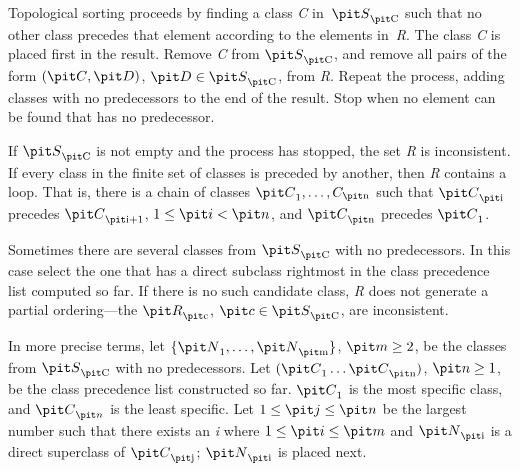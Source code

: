 Topological sorting proceeds by finding a class {\it C} in~${\it S}\sub {\hbox{\scriptsize\it C}}$ such
that no other class precedes that element according to the elements
in~{\it R}.  The class {\it C} is placed first in the result.
Remove {\it C} from ${\it S}\sub {\hbox{\scriptsize\it C}}$, and remove all pairs of the form
$({\it C},{\it D})$,
${\it D}\in {\it S}\sub {\hbox{\scriptsize\it C}}$, from {\it R}. Repeat the process, adding
classes with no predecessors to the end of the result.  Stop when no
element can be found that has no predecessor.

If ${\it S}\sub {\hbox{\scriptsize\it C}}$ is not empty and the process has stopped, the set {\it R} is
inconsistent. If every class in the finite set of classes is preceded
by another, then {\it R} contains a loop. That is, there is a chain of
classes ${\it C}\sub 1,\ldots,C\sub {\hbox{\scriptsize\it n}}$
such that ${\it C}\sub {\hbox{\scriptsize\it i}}$ precedes
${\it C}\sub{\hbox{\scriptsize\it i}+1}$, $1\leq {\it i}<{\it n}$,
and ${\it C}\sub {\hbox{\scriptsize\it n}}$ precedes ${\it C}\sub 1$.

Sometimes there are several classes from ${\it S}\sub {\hbox{\scriptsize\it C}}$ with no
predecessors.  In this case select the one that has a direct
subclass rightmost in the class precedence list computed so far.
If there is no
such candidate class, {\it R} does not generate a partial ordering---the
${\it R}\sub {\hbox{\scriptsize\it c}}$, ${\it c}\in {\it S}\sub {\hbox{\scriptsize\it C}}$, are inconsistent.

In more precise terms, let $\{{\it N}\sub 1,\ldots,{\it N}\sub {\hbox{\scriptsize\it m}}\}$,
${\it m}\geq 2$, be
the classes from ${\it S}\sub {\hbox{\scriptsize\it C}}$ with no predecessors.  Let $({\it C}\sub
1\ldots {\it C}\sub {\hbox{\scriptsize\it n}})$, ${\it n}\geq 1$, be the class precedence list
constructed so far.  ${\it C}\sub 1$ is the most specific class, and ${\it C}\sub
{\it n}$ is the least specific.  Let $1\leq {\it j}\leq {\it n}$ be the largest number
such that there exists an {\it i} where $1\leq {\it i}\leq {\it m}$ and
${\it N}\sub {\hbox{\scriptsize\it i}}$
is a direct superclass of ${\it C}\sub {\hbox{\scriptsize\it j}}$;
${\it N}\sub {\hbox{\scriptsize\it i}}$ is placed next.

